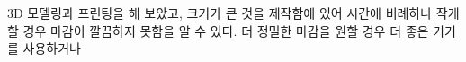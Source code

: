 \documentclass[a4paper, 10pt, nanum]{CSUniSchoolLabReport}
\begin{document}
	3D 모델링과 프린팅을 해 보았고, 크기가 큰 것을 제작함에 있어 시간에 비례하나 작게할 경우 마감이 깔끔하지 못함을 알 수 있다. 더 정밀한 마감을 원할 경우 더 좋은 기기를 사용하거나 



\end{document}
